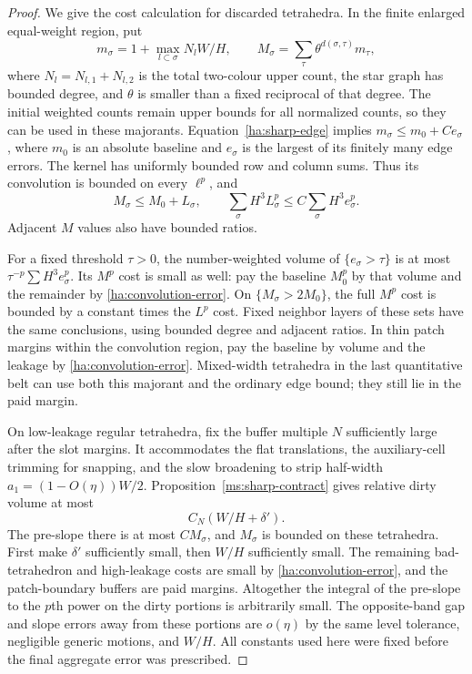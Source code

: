 \documentclass[11pt]{article}
\numberwithin{equation}{section}
\theoremstyle{definition}
\theoremstyle{remark}
\begin{document}
\begin{proof}
We give the cost calculation for discarded tetrahedra.  In the
finite enlarged equal-weight region, put
\[
 m_\sigma=1+\max_{l\subset\sigma}N_lW/H,
 \qquad
 M_\sigma=\sum_{\tau}\theta^{d(\sigma,\tau)}m_\tau,
\]
where $N_l=N_{l,1}+N_{l,2}$ is the total two-colour upper count,
the star graph has bounded degree, and $\theta$ is smaller
than a fixed reciprocal of that degree.  The initial weighted
counts remain upper bounds for all normalized counts, so they can
be used in these majorants.  Equation~\eqref{ha:sharp-edge} implies
$m_\sigma\le m_0+C e_\sigma$, where $m_0$ is an absolute baseline
and $e_\sigma$ is the largest of its finitely many edge errors.
The kernel has uniformly bounded row and column sums.  Thus its
convolution is bounded on every $\ell^p$, and
\begin{equation}\label{ha:convolution-error}
 M_\sigma\le M_0+L_\sigma,
 \qquad
 \sum_\sigma H^3L_\sigma^p
       \le C\sum_\sigma H^3e_\sigma^p.
\end{equation}
Adjacent $M$ values also have bounded ratios.

For a fixed threshold $\tau>0$, the number-weighted volume of
$\{e_\sigma>\tau\}$ is at most
$\tau^{-p}\sum H^3e_\sigma^p$.  Its $M^p$ cost is small as well:
pay the baseline $M_0^p$ by that volume and the remainder by
\eqref{ha:convolution-error}.  On $\{M_\sigma>2M_0\}$, the full
$M^p$ cost is bounded by a constant times the $L^p$ cost.  Fixed
neighbor layers of these sets have the same conclusions, using
bounded degree and adjacent ratios.  In thin patch margins within
the convolution region, pay the baseline by volume and the leakage
by \eqref{ha:convolution-error}.  Mixed-width tetrahedra in the last
quantitative belt can use both this majorant and the ordinary edge
bound; they still lie in the paid margin.

On low-leakage regular tetrahedra, fix the buffer multiple $N$
sufficiently large after the slot margins.  It accommodates the
flat translations, the auxiliary-cell trimming for snapping, and
the slow broadening to strip half-width
$a_1=(1-O(\eta))W/2$.  Proposition~\ref{ms:sharp-contract} gives
relative dirty volume at most
\begin{equation}\label{ha:dirty-fraction}
                           C_N(W/H+\delta').
\end{equation}
The pre-slope there is at most $CM_\sigma$, and $M_\sigma$ is
bounded on these tetrahedra.  First make $\delta'$ sufficiently
small, then $W/H$ sufficiently small.  The remaining bad-tetrahedron
and high-leakage costs are small by
\eqref{ha:convolution-error}, and the patch-boundary buffers are
paid margins.  Altogether the integral of the pre-slope to the
$p$th power on the dirty portions is arbitrarily small.  The
opposite-band gap and slope errors away from these portions are
$o(\eta)$ by the same level tolerance, negligible generic motions,
and $W/H$.  All constants used here were fixed before the final
aggregate error was prescribed.
\end{proof}
\end{document}
